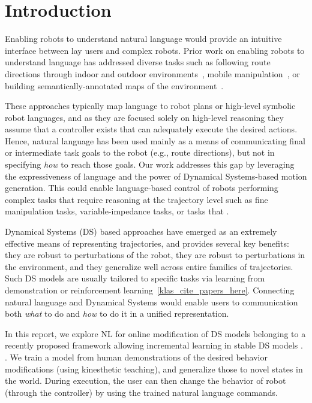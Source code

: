 \section{Introduction}
\label{secIntroduction}

Enabling robots to understand natural language would provide an intuitive interface between lay users and complex robots.
Prior work on enabling robots to understand language has addressed diverse tasks such as following route directions through indoor and outdoor environments~\cite{macmahon06, kollar10, matuszek12a, duvallet13, boularias15}, mobile manipulation~\cite{tellex11, howard14a}, or building semantically-annotated maps of the environment~\cite{walter13}.

These approaches typically map language to robot plans or high-level symbolic robot languages, and as they are focused solely on high-level reasoning they assume that a controller exists that can adequately execute the desired actions.
Hence, natural language has been used mainly as a means of communicating final or intermediate task goals to the robot (e.g., route directions), but not in specifying \emph{how} to reach those goals.
Our work addresses this gap by leveraging the expressiveness of language and the power of Dynamical Systems-based motion generation.
This could enable language-based control of robots performing complex tasks that require reasoning at the trajectory level such as fine manipulation tasks, variable-impedance tasks, or tasks that .

Dynamical Systems (DS) based approaches have emerged as an extremely effective means of representing trajectories, and provides several key benefits:
they are robust to perturbations of the robot,
they are robust to perturbations in the environment,
and they generalize well across entire families of trajectories.
Such DS models are usually tailored to specific tasks via learning from demonstration or reinforcement learning~\ref{klas_cite_papers_here}.
Connecting natural language and Dynamical Systems would enable users to communication both \emph{what} to do and \emph{how} to do it in a unified representation.

In this report, we explore NL for online modification of DS models belonging to a recently proposed framework allowing incremental learning in stable DS models . .
We train a model from human demonstrations of the desired behavior modifications (using kinesthetic teaching), and generalize those to novel states in the world.
During execution, the user can then change the behavior of robot (through the controller) by using the trained natural language commands.



